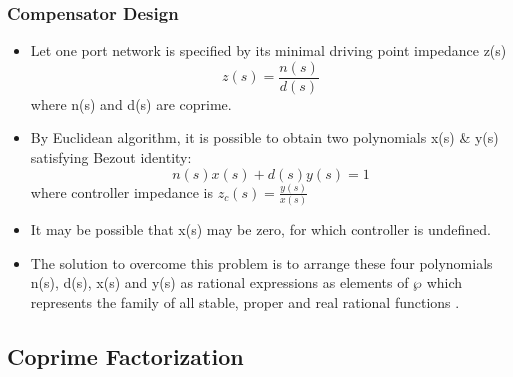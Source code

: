 \documentclass{beamer}
\begin{document}
\begin{frame}
\frametitle{Compensator Design}

\begin{small}
        \begin{itemize}
	\item Let one port network is specified by its minimal driving point impedance z(s)
\begin{equation}
z(s)=\frac{n(s)}{d(s)}
\end{equation}
 where n(s) and d(s) are coprime.
        \item By Euclidean algorithm, it is possible to obtain two polynomials x(s) \& y(s) satisfying Bezout identity:
\begin{equation}
n(s)x(s)+d(s)y(s)=1
\end{equation}
 where controller impedance is $z_c(s)=\frac{y(s)}{x(s)}$
\item It may be possible that x(s) may be zero, for which controller is undefined.
\item The solution to overcome this problem is to arrange these four polynomials n(s), d(s), x(s) and y(s) as rational expressions as elements of $\wp$  which represents the family of all stable, proper and real rational functions \cite{Doyle}.
\end{itemize}
\end{small}
\let\thefootnote\relax{}	
\end{frame}
	






\subsection*{Coprime Factorization}
\end{document}
